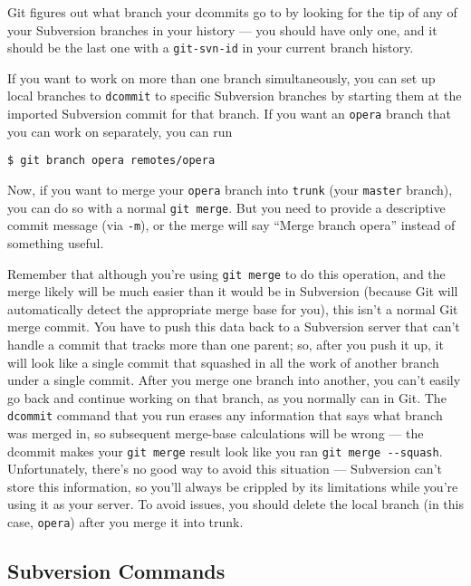 \documentclass[a4paper]{book}
\begin{document}
Git figures out what branch your dcommits go to by looking for the tip of any of your Subversion branches in your history --- you should have only one, and it should be the last one with a \texttt{git-svn-id} in your current branch history.

If you want to work on more than one branch simultaneously, you can set up local branches to \texttt{dcommit} to specific Subversion branches by starting them at the imported Subversion commit for that branch. If you want an \texttt{opera} branch that you can work on separately, you can run

\begin{shaded}\begin{verbatim}
$ git branch opera remotes/opera
\end{verbatim}\end{shaded}

Now, if you want to merge your \texttt{opera} branch into \texttt{trunk} (your \texttt{master} branch), you can do so with a normal \texttt{git merge}. But you need to provide a descriptive commit message (via \texttt{-m}), or the merge will say “Merge branch opera” instead of something useful.

Remember that although you're using \texttt{git merge} to do this operation, and the merge likely will be much easier than it would be in Subversion (because Git will automatically detect the appropriate merge base for you), this isn't a normal Git merge commit. You have to push this data back to a Subversion server that can't handle a commit that tracks more than one parent; so, after you push it up, it will look like a single commit that squashed in all the work of another branch under a single commit. After you merge one branch into another, you can't easily go back and continue working on that branch, as you normally can in Git. The \texttt{dcommit} command that you run erases any information that says what branch was merged in, so subsequent merge-base calculations will be wrong --- the dcommit makes your \texttt{git merge} result look like you ran \texttt{git merge -{}-squash}. Unfortunately, there's no good way to avoid this situation --- Subversion can't store this information, so you'll always be crippled by its limitations while you're using it as your server. To avoid issues, you should delete the local branch (in this case, \texttt{opera}) after you merge it into trunk.

\subsection{Subversion Commands}\label{subversion-commands}
\end{document}
